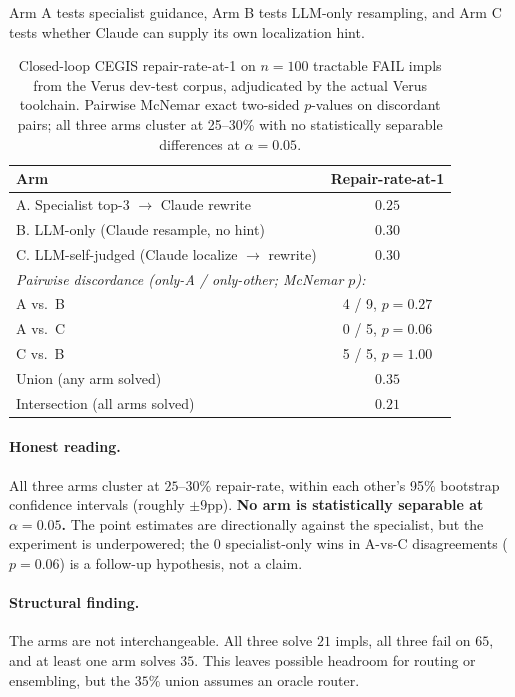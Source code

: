 \documentclass[10pt]{article}
\begin{document}
Arm A tests specialist guidance, Arm B tests LLM-only resampling, and
Arm C tests whether Claude can supply its own localization hint.

\begin{table}[t]
\centering
\small
\caption{Closed-loop CEGIS repair-rate-at-1 on $n=100$ tractable
FAIL impls from the Verus dev-test corpus, adjudicated by the actual
Verus toolchain. Pairwise McNemar exact two-sided $p$-values on
discordant pairs; all three arms cluster at 25--30\% with no
statistically separable differences at $\alpha=0.05$.}
\label{tab:cegis-3arm}
\begin{tabular}{lc}
\toprule
Arm & Repair-rate-at-1 \\
\midrule
A. Specialist top-3 $\to$ Claude rewrite       & $0.25$ \\
B. LLM-only (Claude resample, no hint)         & $0.30$ \\
C. LLM-self-judged (Claude localize $\to$ rewrite) & $0.30$ \\
\midrule
\multicolumn{2}{l}{\emph{Pairwise discordance (only-A / only-other; McNemar $p$):}} \\
A vs.\ B  & 4 / 9, $p=0.27$ \\
A vs.\ C  & 0 / 5, $p=0.06$ \\
C vs.\ B  & 5 / 5, $p=1.00$ \\
\midrule
Union (any arm solved)        & $0.35$ \\
Intersection (all arms solved) & $0.21$ \\
\bottomrule
\end{tabular}
\end{table}

\paragraph{Honest reading.}
All three arms cluster at $25$--$30\%$ repair-rate, within each
other's 95\% bootstrap confidence intervals (roughly $\pm 9$pp).
\textbf{No arm is statistically separable at $\alpha=0.05$.} The point
estimates are directionally against the specialist, but the experiment
is underpowered; the $0$ specialist-only wins in A-vs-C disagreements
($p=0.06$) is a follow-up hypothesis, not a claim.

\paragraph{Structural finding.} The arms are not interchangeable. All
three solve $21$ impls, all three fail on $65$, and at least one arm
solves $35$. This leaves possible headroom for routing or ensembling,
but the $35\%$ union assumes an oracle router.
\end{document}
